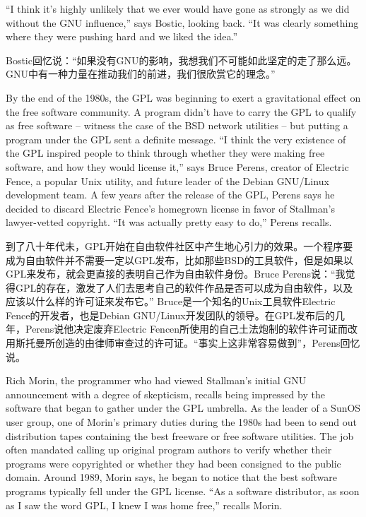\ifdefined\eng
``I think it's highly unlikely that we ever would have gone as strongly as we did without the GNU influence,'' says Bostic, looking back. ``It was clearly something where they were pushing hard and we liked the idea.''
\fi

\ifdefined\chs
Bostic回忆说：“如果没有GNU的影响，我想我们不可能如此坚定的走了那么远。GNU中有一种力量在推动我们的前进，我们很欣赏它的理念。”
\fi

\ifdefined\eng
By the end of the 1980s, the GPL was beginning to exert a gravitational effect on the free software community. A program didn't have to carry the GPL to qualify as free software -- witness the case of the BSD network utilities -- but putting a program under the GPL sent a definite message. ``I think the very existence of the GPL inspired people to think through whether they were making free software, and how they would license it,'' says Bruce Perens, creator of Electric Fence, a popular Unix utility, and future leader of the Debian GNU/Linux development team. A few years after the release of the GPL, Perens says he decided to discard Electric Fence's homegrown license in favor of Stallman's lawyer-vetted copyright. ``It was actually pretty easy to do,'' Perens recalls.
\fi

\ifdefined\chs
到了八十年代未，GPL开始在自由软件社区中产生地心引力的效果。一个程序要成为自由软件并不需要一定以GPL发布，比如那些BSD的工具软件，但是如果以GPL来发布，就会更直接的表明自己作为自由软件身份。Bruce Perens说：“我觉得GPL的存在，激发了人们去思考自己的软件作品是否可以成为自由软件，以及应该以什么样的许可证来发布它。” Bruce是一个知名的Unix工具软件Electric Fence的开发者，也是Debian GNU/Linux开发团队的领导。在GPL发布后的几年，Perens说他决定废弃Electric Fencen所使用的自己土法炮制的软件许可证而改用斯托曼所创造的由律师审查过的许可证。“事实上这非常容易做到”，Perens回忆说。
\fi

\ifdefined\eng
Rich Morin, the programmer who had viewed Stallman's initial GNU announcement with a degree of skepticism, recalls being impressed by the software that began to gather under the GPL umbrella. As the leader of a SunOS user group, one of Morin's primary duties during the 1980s had been to send out distribution tapes containing the best freeware or free software utilities. The job often mandated calling up original program authors to verify whether their programs were copyrighted or whether they had been consigned to the public domain. Around 1989, Morin says, he began to notice that the best software programs typically fell under the GPL license. ``As a software distributor, as soon as I saw the word GPL, I knew I was home free,'' recalls Morin.
\fi

